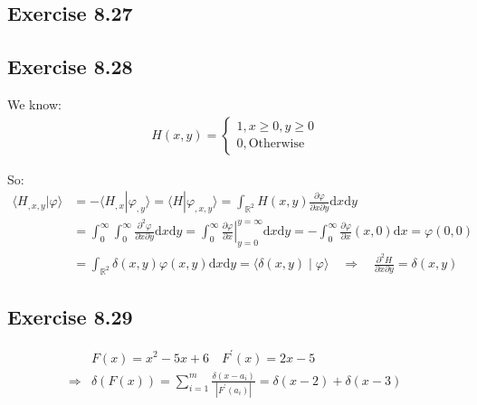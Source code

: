 \documentclass[]{ctexart}
\newcommand{\di}{\mathrm{d}}
\newcommand{\pa}{\partial}
\begin{document}
\subsection{Exercise 8.27}

\subsection{Exercise 8.28}
We know:
\begin{equation*}
\begin{aligned}
H(x,y)=
\begin{cases}
1,x\geq 0,y \geq 0\\
0, \text{Otherwise}
\end{cases}
\end{aligned}
\end{equation*}

So:
\begin{equation*}
\begin{aligned}
\langle H_{,x,y}|\varphi\rangle&=-\langle H_{,x}|\varphi_{,y}\rangle=\langle H|\varphi_{,x,y}\rangle=\int_{\mathbb{R}^2}H(x,y)\frac{\pa \varphi}{\pa x \pa y} \di x \di y\\
&=\int_{0}^{\infty}\int_{0}^{\infty}\frac{\pa ^2 \varphi}{\pa x \pa y}\di x\di y =\int_{0}^{\infty}\left.\frac{\pa\varphi}{\pa x}\right|^{y=\infty}_{y=0}\di x \di y=-\int_{0}^{\infty}\frac{\pa \varphi}{\pa x }(x,0)\di x =\varphi(0,0)\\
&=\int_{\mathbb{R}^{2}} \delta(x, y) \varphi(x, y) \di  x \di y=\langle\delta(x, y) \mid \varphi\rangle \quad \Rightarrow \quad \frac{\partial^{2} H}{\partial x \partial y}=\delta(x, y)
\end{aligned}
\end{equation*}

\subsection{Exercise 8.29}
\begin{equation*}
\begin{aligned}
&F(x)=x^{2}-5 x+6 \quad F^{\prime}(x)=2 x-5 \\
\Rightarrow &\delta(F(x))=\sum_{i=1}^{m} \frac{\delta\left(x-a_{i}\right)}{\left|F^{\prime}\left(a_{i}\right)\right|}=\delta(x-2)+\delta(x-3)
\end{aligned}
\end{equation*}
\end{document}
